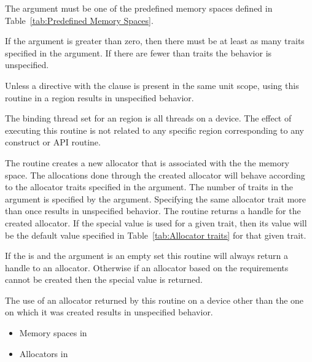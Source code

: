 \constraints

The  argument must be one of the predefined memory spaces defined in Table~\ref{tab:Predefined Memory Spaces}.

If the  argument is greater than zero, then there must be at least as many traits
specified in the  argument. If there are fewer than  traits the behavior is
unspecified.

Unless a  directive with the  clause is present in the same unit scope, using this routine in a  region results in unspecified behavior.

\binding

The binding thread set for an  region is all threads on a device.
The effect of executing this routine is not related to any specific region corresponding to any construct or API routine.

\effect

The  routine creates a new allocator that is associated with the the  memory space. 
The allocations done through the created allocator will behave according to the allocator traits specified in the  argument.  The number of traits in the  argument is specified by the  argument. Specifying the same allocator trait more than once results in unspecified behavior. The routine returns a handle for the created allocator. If the special  value is used for a given trait, then its value will be the default value specified in Table~\ref{tab:Allocator traits} for that given trait.

If the  is  and the  argument is an empty set this routine will always return a handle to an allocator. Otherwise if an allocator based on the requirements cannot be created then the special value  is returned.

The use of an allocator returned by this routine on a device other than the one on which it was created results in unspecified behavior.

\crossreferences
\begin{itemize}
\item Memory spaces in 
\item Allocators in 
\end{itemize}

